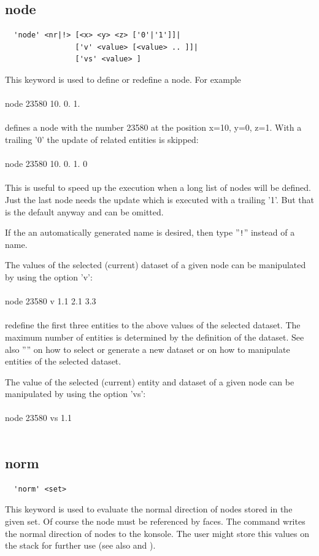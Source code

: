 \documentclass{article}
\begin{document}
\subsection{\label{node}node}
\begin{verbatim}
  'node' <nr|!> [<x> <y> <z> ['0'|'1']]|
                ['v' <value> [<value> .. ]]|
                ['vs' <value> ]
\end{verbatim}
This keyword is used to define or redefine a node. For example\\\\node 23580 10. 0. 1.\\\\defines a node with the number 23580 at the position x=10, y=0, z=1. With a trailing '0' the update of related entities is skipped:\\\\node 23580 10. 0. 1. 0\\\\This is useful to speed up the execution when a long list of nodes will be defined. Just the last node needs the update which is executed with a trailing '1'. But that is the default anyway and can be omitted.

If the an automatically generated name is desired, then type ''\verb_!_'' instead of a name.

The values of the selected (current) dataset of a given node can be manipulated by using the option 'v':\\\\
node 23580 v 1.1 2.1 3.3\\\\
redefine the first three entities to the above values of the selected dataset. The maximum number of entities is determined by the definition of the dataset. See also '''' on how to select or generate a new dataset or on how to manipulate entities of the selected dataset.

The value of the selected (current) entity and dataset of a given node can be manipulated by using the option 'vs':\\\\
node 23580 vs 1.1\\\\


\subsection{\label{norm}norm}
\begin{verbatim}
  'norm' <set> 
\end{verbatim}
This keyword is used to evaluate the normal direction of nodes stored in the given set. Of course the node must be referenced by faces. The command writes the normal direction of nodes to the konsole. The user might store this values on the stack for further use (see also  and ). 
\end{document}
